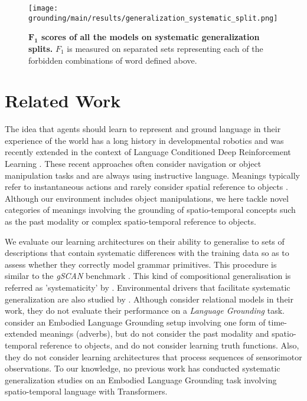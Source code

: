 
\begin{figure}[h]
\centering
\texttt{[image: grounding/main/results/generalization\_systematic\_split.png]}
\caption{\textbf{$\mathbf{F_1}$ scores of all the models on systematic generalization splits.} $F_1$ is measured on separated sets representing each of the forbidden combinations of word defined above.}
\label{fig:res_systematic_split}
\end{figure}

\section{Related Work}

The idea that agents should learn to represent and ground language in their experience of the world has a long history in developmental robotics \cite{zwaan_madden_2005, steels2006semiotic, sugita2005learning, cangelosi2010} and was recently extended in the context of Language Conditioned Deep Reinforcement Learning \cite{chevalierboisvert2019babyai, hermann2017grounded, Luketina2019, bahdanau2019learning}. These recent approaches often consider navigation \cite{chen2011learning, chaplot2018gatedattention} or object manipulation \cite{akakzia:hal-03121146,hermann2017grounded} tasks and are always using instructive language. Meanings typically refer to instantaneous actions and rarely consider spatial reference to objects \cite{Paul2016EfficientGO}. Although our environment includes object manipulations, we here tackle novel categories of meanings involving the grounding of spatio-temporal concepts such as the past modality or complex spatio-temporal reference to objects.

We evaluate our learning architectures on their ability to generalise to sets of descriptions that contain systematic differences with the training data so as to assess whether they correctly model grammar primitives. This procedure is similar to the \textit{gSCAN} benchmark \cite{ruis2020benchmark}. This kind of compositional generalisation is referred as 'systematicity' by \citet{hupkes2020compositionality}. Environmental drivers that facilitate systematic generalization are also studied by \citet{hill2020environmental}. Although \citet{hupkes2020compositionality} consider relational models in their work, they do not evaluate their performance on a \textit{Language Grounding} task. \citet{ruis2020benchmark} consider an Embodied Language Grounding setup involving one form of time-extended meanings (adverbs), but do not consider the past modality and spatio-temporal reference to objects, and do not consider learning truth functions. Also, they do not consider learning architectures that process sequences of sensorimotor observations.
To our knowledge, no previous work has conducted systematic generalization studies on an Embodied Language Grounding task involving spatio-temporal language with Transformers.

